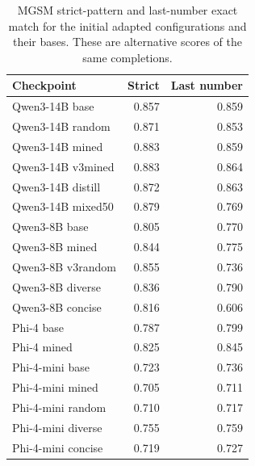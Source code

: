 \begin{table}[!htbp]\caption{MGSM strict-pattern and last-number exact match for the initial adapted configurations and their bases. These are alternative scores of the same completions.}\label{t:extraction}\centering\footnotesize\renewcommand{\arraystretch}{0.900}\begin{tabular}{lrr}\toprule Checkpoint & Strict & Last number\\\midrule
Qwen3-14B base & 0.857 & 0.859\\
Qwen3-14B random & 0.871 & 0.853\\
Qwen3-14B mined & 0.883 & 0.859\\
Qwen3-14B v3mined & 0.883 & 0.864\\
Qwen3-14B distill & 0.872 & 0.863\\
Qwen3-14B mixed50 & 0.879 & 0.769\\
Qwen3-8B base & 0.805 & 0.770\\
Qwen3-8B mined & 0.844 & 0.775\\
Qwen3-8B v3random & 0.855 & 0.736\\
Qwen3-8B diverse & 0.836 & 0.790\\
Qwen3-8B concise & 0.816 & 0.606\\
Phi-4 base & 0.787 & 0.799\\
Phi-4 mined & 0.825 & 0.845\\
Phi-4-mini base & 0.723 & 0.736\\
Phi-4-mini mined & 0.705 & 0.711\\
Phi-4-mini random & 0.710 & 0.717\\
Phi-4-mini diverse & 0.755 & 0.759\\
Phi-4-mini concise & 0.719 & 0.727\\
\bottomrule\end{tabular}\end{table}
